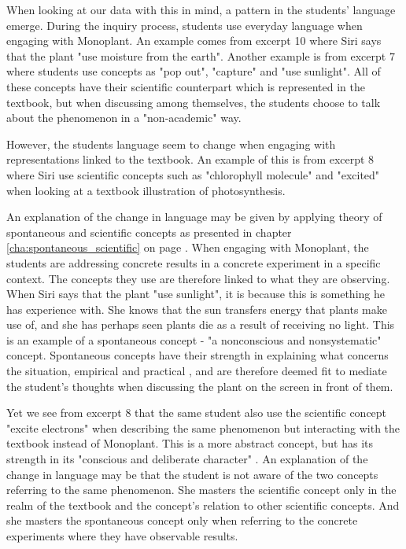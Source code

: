 When looking at our data with this in mind, a pattern in the students' language emerge. During the inquiry process, students use everyday language when engaging with Monoplant. An example comes from excerpt 10 where Siri says that the plant "use moisture from the earth". Another example is from excerpt 7 where students use concepts as "pop out", "capture" and "use sunlight". All of these concepts have their scientific counterpart which is represented in the textbook, but when discussing among themselves, the students choose to talk about the phenomenon in a "non-academic" way. 

However, the students language seem to change when engaging with representations linked to the textbook. An example of this is from excerpt 8 where Siri use scientific concepts such as "chlorophyll molecule" and "excited" when looking at a textbook illustration of photosynthesis. 

An explanation of the change in language may be given by applying \citet{vygotsky2012thought} theory of spontaneous and scientific concepts as presented in chapter \ref{cha:spontaneous_scientific} on page \pageref{cha:spontaneous_scientific}. When engaging with Monoplant, the students are addressing concrete results in a concrete experiment in a specific context. The concepts they use are therefore linked to what they are observing. When Siri says that the plant "use sunlight", it is because this is something he has experience with. She knows that the sun transfers energy that plants make use of, and she has perhaps seen plants die as a result of receiving no light. This is an example of a spontaneous concept \citep{vygotsky2012thought} - "a nonconscious and nonsystematic" concept. Spontaneous concepts have their strength in explaining what concerns the situation, empirical and practical \citep{vygotsky2012thought}, and are therefore deemed fit to mediate the student's thoughts when discussing the plant on the screen in front of them. 


Yet we see from excerpt 8 that the same student also use the scientific concept "excite electrons" when describing the same phenomenon but interacting with the textbook instead of Monoplant. This is a more abstract concept, but has its strength in its "conscious and deliberate character" \citep{vygotsky2012thought}. An explanation of the change in language may be that the student is not aware of the two concepts referring to the same phenomenon. She masters the scientific concept only in the realm of the textbook and the concept's relation to other scientific concepts. And she masters the spontaneous concept only when referring to the concrete experiments where they have observable results. 

